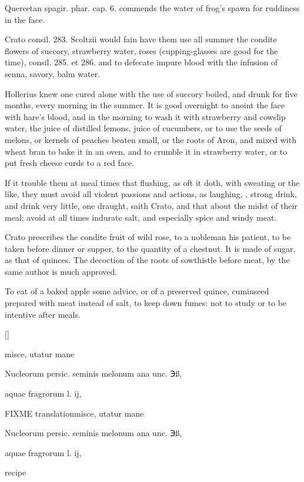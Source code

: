 \textlatin{Quercetan spagir. phar. cap. 6.}
commends the water of frog's spawn for ruddiness in the face.

Crato \textlatin{consil. 283. Scoltzii} would fain have them use all summer
the condite flowers of succory, strawberry water, roses
(cupping-glasses are good for the time), consil. 285. et 286. and to
defecate impure blood with the infusion of senna, savory, balm water.

Hollerius knew one cured alone with the use of succory boiled,
and drunk for five months, every morning in the summer. It is
good overnight to anoint the face with hare's blood, and in the morning
to wash it with strawberry and cowslip water, the juice of distilled
lemons, juice of cucumbers, or to use the seeds of melons, or kernels
of peaches beaten small, or the roots of Aron, and mixed with wheat
bran to bake it in an oven, and to crumble it in strawberry water,
 or to put fresh cheese curds to a red face.

If it trouble them at meal times that flushing, as oft it doth, with
sweating or the like, they must avoid all violent passions and actions,
as laughing, \etc{}, strong drink, and drink very little, one
draught, saith Crato, and that about the midst of their meal; avoid at
all times indurate salt, and especially spice and windy meat.

Crato prescribes the condite fruit of wild rose, to a nobleman
his patient, to be taken before dinner or supper, to the quantity of a
chestnut. It is made of sugar, as that of quinces. The decoction of the
roots of sowthistle before meat, by the same author is much approved.

To eat of a baked apple some advice, or of a preserved quince,
cuminseed prepared with meat instead of salt, to keep down fumes: not
to study or to be intentive after meals.

\begin{Prescription}[H]
[\baselineskip]
\begin{prescriptionbox}{}{\textlatin{misce, utatur mane}}
\item \textlatin{Nucleorum persic. seminis melonum ana unc. ℈ß},
\item \textlatin{aquae fragrorum l. ij},
\end{prescriptionbox}
\begin{prescriptionbox}{FIXME translation}{\textlatin{misce, utatur mane}}
\item \textlatin{Nucleorum persic. seminis melonum ana unc. ℈ß},
\item \textlatin{aquae fragrorum l. ij},
\end{prescriptionbox}
\caption{ recipe}
\end{Prescription}

